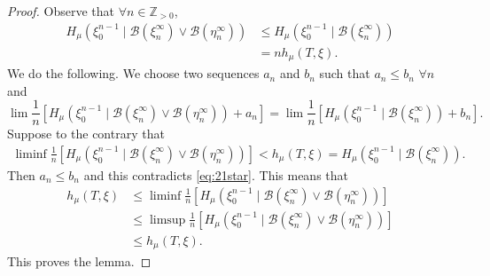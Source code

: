 \documentclass{article}
\begin{document}
\begin{proof}
  Observe that $\forall n \in \mathbb{Z}_{>0}$,
  \begin{align*}
    H_\mu(\xi_0^{n-1} \mid \mathcal{B}(\xi_n^\infty) \lor \mathcal{B}(\eta_n^\infty)) &\leq H_\mu(\xi_0^{n-1} \mid \mathcal{B}(\xi_n^\infty)) \\
                                                                                      &= n h_\mu(T,\xi).
  \end{align*}
  We do the following. We choose two sequences $a_n$ and $b_n$ such that $a_n \leq b_n$ $\forall n$ and
  \begin{equation}
    \lim \frac{1}{n} [H_\mu(\xi_0^{n-1} \mid \mathcal{B}(\xi_n^\infty) \vee \mathcal{B}(\eta_n^\infty)) + a_n] = \lim \frac{1}{n} [H_\mu(\xi_0^{n-1} \mid \mathcal{B}(\xi_n^\infty)) + b_n]. \label{eq:21star}
  \end{equation}
  Suppose to the contrary that
  \begin{align*}
    \liminf \frac{1}{n} [H_\mu(\xi_0^{n-1} \mid \mathcal{B}(\xi_n^\infty) \vee \mathcal{B}(\eta_n^\infty))] < h_\mu(T,\xi) = H_\mu(\xi_0^{n-1} \mid \mathcal{B}(\xi_n^\infty)).
  \end{align*}
  Then $a_n \leq b_n$ and this contradicts \eqref{eq:21star}.
  This means that
  \begin{align*}
    h_\mu(T,\xi) &\leq \liminf \frac{1}{n} [H_\mu(\xi_0^{n-1} \mid \mathcal{B}(\xi_n^\infty) \vee \mathcal{B}(\eta_n^\infty))] \\
                 &\leq \limsup\frac{1}{n} [H_\mu(\xi_0^{n-1} \mid \mathcal{B}(\xi_n^\infty) \vee \mathcal{B}(\eta_n^\infty))] \\
                 &\leq h_\mu(T,\xi).
  \end{align*}
  This proves the lemma.


\end{proof}
\end{document}
